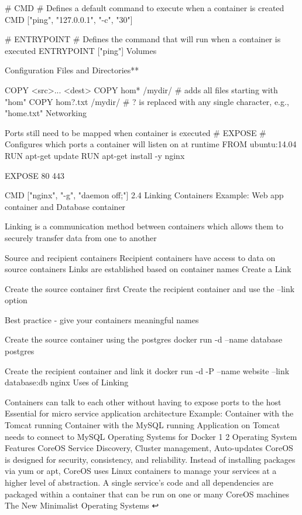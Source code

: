 # CMD
# Defines a default command to execute when a container is created
CMD ["ping", "127.0.0.1", "-c", "30"]

# ENTRYPOINT
# Defines the command that will run when a container is executed
ENTRYPOINT ["ping"]
Volumes

Configuration Files and Directories**

COPY <src>... <dest>
COPY hom* /mydir/        # adds all files starting with "hom"
COPY hom?.txt /mydir/    # ? is replaced with any single character, e.g., "home.txt"
Networking

Ports still need to be mapped when container is executed
# EXPOSE
# Configures which ports a container will listen on at runtime
FROM ubuntu:14.04
RUN apt-get update
RUN apt-get install -y nginx

EXPOSE 80 443

CMD ["nginx", "-g", "daemon off;"]
2.4 Linking Containers
Example: Web app container and Database container

Linking is a communication method between containers which allows them to securely transfer data from one to another

Source and recipient containers
Recipient containers have access to data on source containers
Links are established based on container names
Create a Link

Create the source container first
Create the recipient container and use the --link option

Best practice - give your containers meaningful names

Create the source container using the postgres
docker run -d --name database postgres

Create the recipient container and link it
docker run -d -P --name website --link database:db nginx
Uses of Linking

Containers can talk to each other without having to expose ports to the host
Essential for micro service application architecture
Example:
Container with the Tomcat running
Container with the MySQL running
Application on Tomcat needs to connect to MySQL
Operating Systems for Docker 1 2
Operating System	Features
CoreOS	Service Discovery, Cluster management, Auto-updates
CoreOS is designed for security, consistency, and reliability. Instead of installing packages via yum or apt, CoreOS uses Linux containers to manage your services at a higher level of abstraction. A single service’s code and all dependencies are packaged within a container that can be run on one or many CoreOS machines
The New Minimalist Operating Systems ↩

